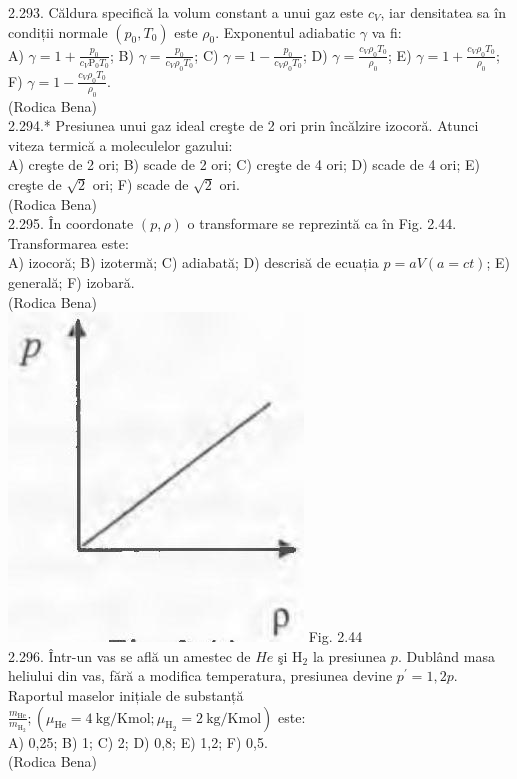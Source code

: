 2.293. Căldura specifică la volum constant a unui gaz este $c_{V}$, iar densitatea sa în condiții normale $\left(p_{0}, T_{0}\right)$ este $\rho_{0}$. Exponentul adiabatic $\gamma$ va fi:\\ A) $\gamma=1+\frac{p_{0}}{c_{V} \mathrm{P}_{0} T_{0}}$; B) $\gamma=\frac{p_{0}}{c_{V} \rho_{0} T_{0}}$; C) $\gamma=1-\frac{p_{0}}{c_{V} \rho_{0} T_{0}}$; D) $\gamma=\frac{c_{V} \rho_{0} T_{0}}{\rho_{0}}$; E) $\gamma=1+\frac{c_{V} \rho_{0} T_{0}}{\rho_{0}}$; F) $\gamma=1-\frac{c_{V} \rho_{0} T_{0}}{\rho_{0}}$.\\ (Rodica Bena)\\

2.294.* Presiunea unui gaz ideal creşte de 2 ori prin încălzire izocoră. Atunci viteza termică a moleculelor gazului:\\ A) creşte de 2 ori; B) scade de 2 ori; C) creşte de 4 ori; D) scade de 4 ori; E) creşte de $\sqrt{2}$ ori; F) scade de $\sqrt{2}$ ori.\\ (Rodica Bena)\\

2.295. În coordonate $(p, \rho)$ o transformare se reprezintă ca în Fig. 2.44. Transformarea este:\\ A) izocoră; B) izotermă; C) adiabată; D) descrisă de ecuația $p=a V(a=c t)$; E) generală; F) izobară.\\ (Rodica Bena)\\ \includegraphics[width=0.4\linewidth]{images/2025_07_01_5b3ff9fa0d508c8e9f17g-139} Fig. 2.44\\

2.296. Într-un vas se află un amestec de $He$ şi $\mathrm{H}_{2}$ la presiunea $p$. Dublând masa heliului din vas, fără a modifica temperatura, presiunea devine $p^{\prime}=1,2 p$. Raportul maselor inițiale de substanță $\frac{m_{\mathrm{He}}}{m_{\mathrm{H}_{2}}} ;\left(\mu_{\mathrm{He}}=4 \mathrm{~kg} / \mathrm{Kmol} ; \mu_{\mathrm{H}_{2}}=2 \mathrm{~kg} / \mathrm{Kmol}\right)$ este:\\ A) 0,25; B) 1; C) 2; D) 0,8; E) 1,2; F) 0,5.\\ (Rodica Bena)\\

